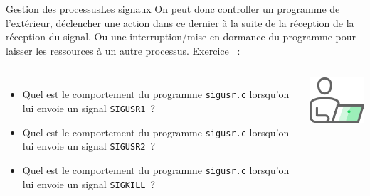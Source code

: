 \documentclass{beamer}
\begin{document}
    \begin{frame}{Gestion des processus}{Les signaux}
        On peut donc controller un programme de l'extérieur, déclencher une action dans ce dernier à la suite de la réception de la réception du signal.
        Ou une interruption/mise en dormance du programme pour laisser les ressources à un autre processus.
        \bigbreak
        Exercice \execcounterdispinc{}~:
        \begin{columns}
            \begin{itemize}
                \item Quel est le comportement du programme \lstinline{sigusr.c} lorsqu'on lui envoie un signal \lstinline{SIGUSR1}~?
                \item Quel est le comportement du programme \lstinline{sigusr.c} lorsqu'on lui envoie un signal \lstinline{SIGUSR2}~?
                \item Quel est le comportement du programme \lstinline{sigusr.c} lorsqu'on lui envoie un signal \lstinline{SIGKILL}~?
            \end{itemize}
            \centering
            \includegraphics[width=3cm]{image/guy-in-front-of-desktop}
        \end{columns}
    \end{frame}
\end{document}
